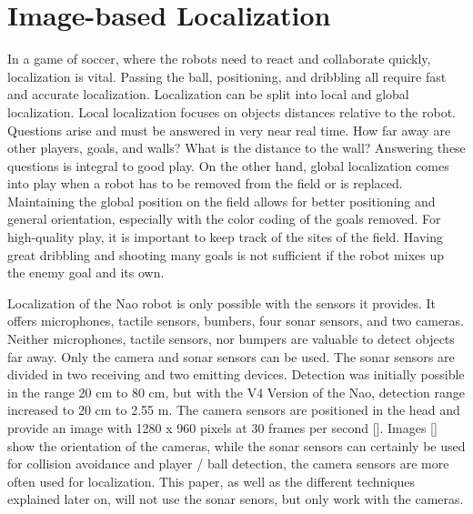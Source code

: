 \documentclass[12pt, a4paper]{apa6}
\begin{document}
  \section{Image-based Localization}
  In a game of soccer, where the robots need to react and collaborate quickly, localization is vital. Passing the ball, positioning, and dribbling all require fast and accurate localization. Localization can be split into local and global localization. Local localization focuses on objects distances relative to the robot. Questions arise and must be answered in very near real time. How far away are other players, goals, and walls? What is the distance to the wall? Answering these questions is integral to good play. On the other hand, global localization comes into play when a robot has to be removed from the field or is replaced. Maintaining the global position on the field allows for better positioning and general orientation, especially with the color coding of the goals removed. For high-quality play, it is important to keep track of the sites of the field. Having great dribbling and shooting many goals is not sufficient if the robot mixes up the enemy goal and its own.

  Localization of the Nao robot is only possible with the sensors it provides. It offers microphones, tactile sensors, bumbers, four sonar sensors, and two cameras. Neither microphones, tactile sensors, nor bumpers are valuable to detect objects far away. Only the camera and sonar sensors can be used. The sonar sensors are divided in two receiving and two emitting devices. Detection was initially possible in the range 20 cm to 80 cm, but with the V4 Version of the Nao, detection range increased to 20 cm to 2.55 m. The camera sensors are positioned in the head and provide an image with 1280 x 960 pixels at 30 frames per second []. Images [] show the orientation of the cameras, while the sonar sensors can certainly be used for collision avoidance and player / ball detection, the camera sensors are more often used for localization. This paper, as well as the different techniques explained later on, will not use the sonar senors, but only work with the cameras.
\end{document}
